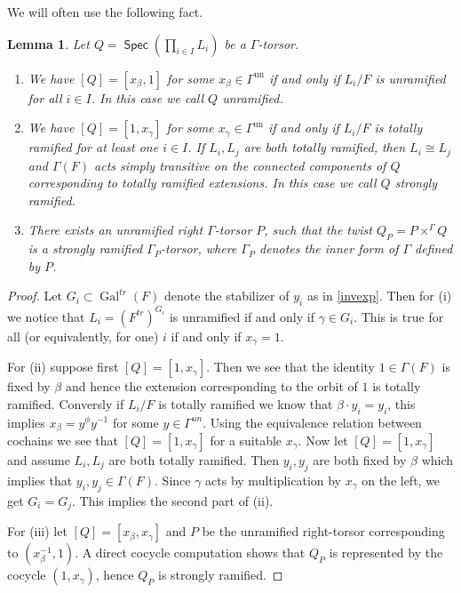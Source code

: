 \documentclass{article}
\DeclareMathOperator{\Zb}{\mathbb{Z}}
\DeclareMathOperator{\Gal}{Gal}
\DeclareMathOperator{\Spec}{\mathsf{Spec}}
\theoremstyle{definition}
\theoremstyle{plain}
\newtheorem{lemma}[definition]{Lemma}
\begin{document}
We will often use the following fact.


\begin{lemma}\label{lemma:madealemmaoutofit} Let $Q = \Spec\left( \prod_{i\in I} L_i   \right)$ be a $\Gamma$-torsor. 
\begin{enumerate}
\item[(i)] We have $[Q] = [x_\beta,1]$ for some $x_\beta \in \Gamma^\text{un}$ if and only if $L_i/F$ is unramified for all $i\in I$. In this case we call $Q$ unramified.
\item[(ii)] We have $[Q] = [1,x_\gamma]$ for some $x_\gamma \in \Gamma^\text{un}$ if and only if $L_i/F$ is totally ramified for at least one $i\in I$. If $L_i,L_j$ are both totally ramified, then $L_i \cong L_j$ and $\Gamma(F)$ acts simply transitive on the connected components of $Q$ corresponding to totally ramified extensions. In this case we call $Q$ strongly ramified.
\item[(iii)] There exists an unramified right $\Gamma$-torsor $P$, such that the twist $Q_P = P \times^\Gamma Q$ is a strongly ramified $\Gamma_P$-torsor, where $\Gamma_P$ denotes the inner form of $\Gamma$ defined by $P$. 
\end{enumerate}
\end{lemma}

\begin{proof} Let $G_i \subset \Gal^{tr}(F)$ denote the stabilizer of $y_i$ as in \eqref{invexp}. Then for (i) we notice that $L_i=\left( F^{tr} \right)^{G_i}$ is unramified if and only if $\gamma \in G_i$. This is true for all (or equivalently, for one) $i$ if and only if $x_\gamma = 1$.

For (ii) suppose first $[Q] = [1,x_\gamma] $. Then we see that the identity $1 \in \Gamma(F)$ is fixed by $\beta$ and hence the extension corresponding to the orbit of $1$ is totally ramified. Conversly if $L_i / F$ is totally ramified we know that $\beta \cdot y_i = y_i$, this implies $x_\beta = y {}^\phi y^{-1}$ for some $y\in \Gamma^{un}$. Using the equivalence relation between cochains we see that  $[Q] = [1,x_\gamma] $ for a suitable $x_\gamma$. Now let $[Q] = [1,x_\gamma]$ and assume $L_i,L_j$ are both totally ramified. Then $y_i,y_j$ are both fixed by $\beta$ which implies that $y_i,y_j \in \Gamma(F)$. Since $\gamma$ acts by multiplication by $x_\gamma$ on the left, we get $G_i = G_j$. This implies the second part of (ii).

 For (iii) let $[Q] =[x_\beta,x_\gamma]$ and $P$ be the unramified right-torsor corresponding to $(x_\beta^{-1},1)$. A direct cocycle computation shows that $Q_P$ is represented by the cocycle $(1,x_\gamma)$, hence $Q_P$ is strongly ramified.


\end{proof}
\end{document}
